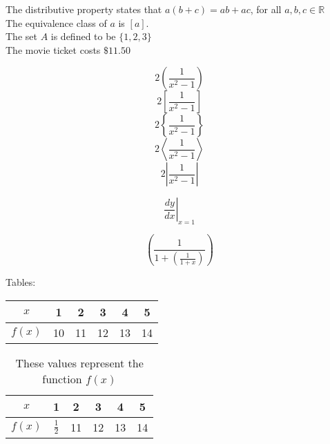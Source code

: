 \documentclass[11pt]{article}
\begin{document}
The distributive property states that $a(b+c) = ab + ac$, for all $a,b,c \in \mathbb{R}$\\[6pt]
The equivalence class of $a$ is $[a]$.\\[6pt]
The set $A$ is defined to be $\{1,2,3\}$\\[6pt]
The movie ticket costs $\$11.50$

$$2\left(\frac{1}{x^2 - 1}\right)$$
$$2\left[\frac{1}{x^2 - 1}\right]$$
$$2\left\{     \frac{1}{x^2 - 1}\right\}$$
$$2\left \langle     \frac{1}{x^2 - 1}      \right \rangle$$
$$2\left |     \frac{1}{x^2 - 1}      \right |$$



$$\left.\frac{dy}{dx}\right|_{x=1}$$




$$\left(\frac{1}{1+\left(\frac{1}{1 + x}\right)}\right)$$


Tables:\\

\begin{tabular}{|c||c|c|c|c|c|} %
    \hline %
    $x$ & 1 & 2 & 3 & 4 & 5 \\ %
    \hline
    $f(x)$ & 10 & 11 & 12 & 13 & 14
\end{tabular}


\vspace{1cm}

\begin{table}[H] %
\centering %
\def\arraystretch{1.5} %
\begin{tabular}{|c||c|c|c|c|c|}
    \hline
    $x$ & 1 & 2 & 3 & 4 & 5 \\ %
    \hline
    $f(x)$ & $\frac{1}{2}$  & 11 & 12 & 13 & 14
\end{tabular}
\caption{These values represent the function $f(x)$}
\end{table}
\end{document}
